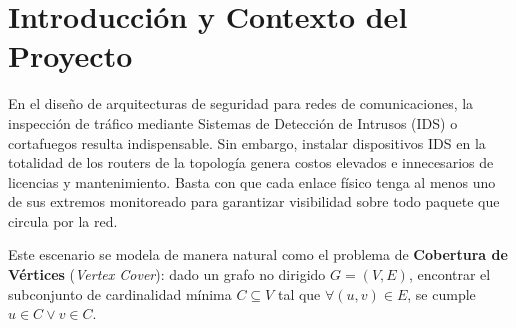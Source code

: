 \documentclass[11pt,a4paper]{article}
\begin{document}
\begin{abstract}
Este informe documenta la entrega e integración del \textbf{Avance 05} para el proyecto de ubicación óptima de Sistemas de Detección de Intrusos (IDS) modelado como Cobertura de Vértices (\textit{Vertex Cover}). Se presenta la implementación funcional y la evaluación del segundo algoritmo del proyecto: la 2-aproximación por Emparejamiento Maximal (\textit{Maximal Matching}), así como su integración con la heurística Greedy por Grado y el algoritmo exacto por Fuerza Bruta. El sistema cuenta con una arquitectura modular en Python (\texttt{src/}), un conjunto de 27 pruebas unitarias e integrales automatizadas con \texttt{pytest} (cobertura del 100\% en casos básicos, límite y adversarios) y una interfaz de línea de comandos unificada (\texttt{demo.py}) que maneja errores y entradas inválidas de forma interactiva. Se incluye el análisis empírico sobre instancias pequeñas y adicionales de escala ($n=6$ a $n=18$), demostrando la validez de los resultados mediante el módulo unificado de verificación (\texttt{verify.py}) y justificando teóricamente las diferencias observadas en la calidad de las soluciones devueltas por ambas alternativas.
\end{abstract}

\tableofcontents
\newpage

\section{Introducción y Contexto del Proyecto}
En el diseño de arquitecturas de seguridad para redes de comunicaciones, la inspección de tráfico mediante Sistemas de Detección de Intrusos (IDS) o cortafuegos resulta indispensable. Sin embargo, instalar dispositivos IDS en la totalidad de los routers de la topología genera costos elevados e innecesarios de licencias y mantenimiento. Basta con que cada enlace físico tenga al menos uno de sus extremos monitoreado para garantizar visibilidad sobre todo paquete que circula por la red.

Este escenario se modela de manera natural como el problema de \textbf{Cobertura de Vértices} (\textit{Vertex Cover}): dado un grafo no dirigido $G = (V, E)$, encontrar el subconjunto de cardinalidad mínima $C \subseteq V$ tal que $\forall (u, v) \in E$, se cumple $u \in C \lor v \in C$.
\end{document}
